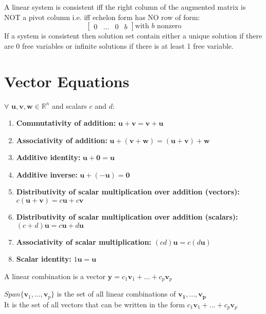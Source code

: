 \documentclass{report}
\begin{document}
A linear system is consistent iff the right column of the augmented matrix is NOT a pivot column
i.e. iff echelon form has NO row of form:
\[\begin{bmatrix}
    0 & \ldots & 0 & b
\end{bmatrix} \text{with $b$ nonzero}
\]
If a system is consistent then solution set contain either a unique solution if there are 0 free variables
or infinite solutions if there is at least 1 free variable.

\section{Vector Equations}
\begin{tcolorbox}[colback=blue!5!white, colframe=blue!75!black, title=Algebraic Properties of Vectors in $\mathbb{R}^n$]
$\forall$ $\mathbf{u}, \mathbf{v}, \mathbf{w} \in \mathbb{R}^n$ and scalars $c$ and $d$:
\begin{enumerate}
    \item \textbf{Commutativity of addition:} $\mathbf{u} + \mathbf{v} = \mathbf{v} + \mathbf{u}$
    \item \textbf{Associativity of addition:} $\mathbf{u} + (\mathbf{v} + \mathbf{w}) = (\mathbf{u} + \mathbf{v}) + \mathbf{w}$
    \item \textbf{Additive identity:} $\mathbf{u} + \mathbf{0} = \mathbf{u}$
    \item \textbf{Additive inverse:} $\mathbf{u} + (-\mathbf{u}) = \mathbf{0}$
    \item \textbf{Distributivity of scalar multiplication over addition (vectors):} $c(\mathbf{u} + \mathbf{v}) = c\mathbf{u} + c\mathbf{v}$
    \item \textbf{Distributivity of scalar multiplication over addition (scalars):} $(c + d)\mathbf{u} = c\mathbf{u} + d\mathbf{u}$
    \item \textbf{Associativity of scalar multiplication:} $(cd)\mathbf{u} = c(d\mathbf{u})$
    \item \textbf{Scalar identity:} $1 \mathbf{u} = \mathbf{u}$
\end{enumerate}
\end{tcolorbox}
    
A linear combination is a vector $\mathbf{y} = c_1\mathbf{v}_1 + \ldots + c_p\mathbf{v}_p$

\begin{definition}
    $Span\{\mathbf{v}_1, \ldots, \mathbf{v}_p\}$ is the set of all linear combinations of $\mathbf{v_1}, \ldots, \mathbf{v_p}$
    \\It is the set of all vectors that can be written in the form $c_1\mathbf{v}_1 + \ldots + c_p\mathbf{v}_p$
\end{definition}
\end{document}
